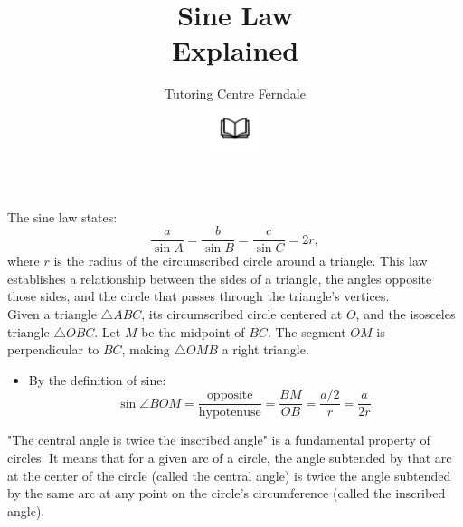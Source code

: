 \documentclass[a4paper,12pt]{article}
\title{Sine Law\\Explained}
\author{Tutoring Centre Ferndale\\
\includegraphics[width=4em]{ApS_logo.png}}
\date{}
\begin{document}
\maketitle

The sine law states:
\[
\frac{a}{\sin A} = \frac{b}{\sin B} = \frac{c}{\sin C} = 2r,
\]
where \(r\) is the radius of the circumscribed circle around a triangle. This law establishes a relationship between the sides of a triangle, the angles opposite those sides, and the circle that passes through the triangle's vertices.\\

Given a triangle \(\triangle ABC\), its circumscribed circle centered at \(O\), and the isosceles triangle \(\triangle OBC\). Let \(M\) be the midpoint of \(BC\). The segment \(OM\) is perpendicular to \(BC\), making \(\triangle OMB\) a right triangle.

\begin{center}
\end{center}

\newpage

\begin{itemize}
\item By the definition of sine:
\[
\sin \angle BOM = \frac{\text{opposite}}{\text{hypotenuse}} = \frac{BM}{OB} = \frac{a/2}{r} = \frac{a}{2r}.
\]
\end{itemize}

"The central angle is twice the inscribed angle" is a fundamental property of circles. It means that for a given arc of a circle, the angle subtended by that arc at the center of the circle (called the central angle) is twice the angle subtended by the same arc at any point on the circle's circumference (called the inscribed angle).\\
\end{document}

